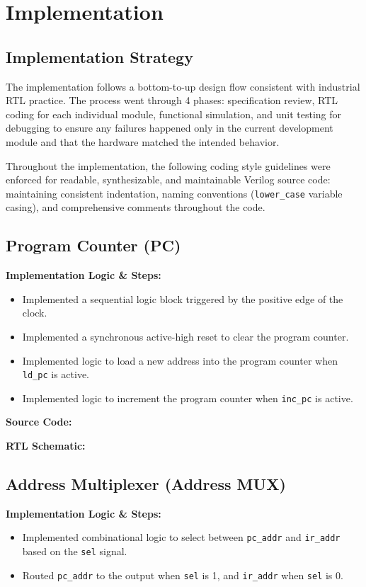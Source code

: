 \section{Implementation}\label{sec:implementation} %
\subsection{Implementation Strategy}
The implementation follows a bottom-to-up design flow consistent with industrial RTL practice. The process went through 4 phases: specification review, RTL coding for each individual module, functional simulation, and unit testing for debugging to ensure any failures happened only in the current development module and that the hardware matched the intended behavior.

Throughout the implementation, the following coding style guidelines were enforced for readable, synthesizable, and maintainable Verilog source code: maintaining consistent indentation, naming conventions (\texttt{lower\_case} variable casing), and comprehensive comments throughout the code.

\subsection{Program Counter (PC)}
\textbf{Implementation Logic \& Steps:}
\begin{itemize}
	\item Implemented a sequential logic block triggered by the positive edge of the clock.
	\item Implemented a synchronous active-high reset to clear the program counter.
	\item Implemented logic to load a new address into the program counter when \texttt{ld\_pc} is active.
	\item Implemented logic to increment the program counter when \texttt{inc\_pc} is active.
\end{itemize}

\textbf{Source Code:}

\textbf{RTL Schematic:}

\subsection{Address Multiplexer (Address MUX)}
\textbf{Implementation Logic \& Steps:}
\begin{itemize}
	\item Implemented combinational logic to select between \texttt{pc\_addr} and \texttt{ir\_addr} based on the \texttt{sel} signal.
	\item Routed \texttt{pc\_addr} to the output when \texttt{sel} is 1, and \texttt{ir\_addr} when \texttt{sel} is 0.
\end{itemize}

